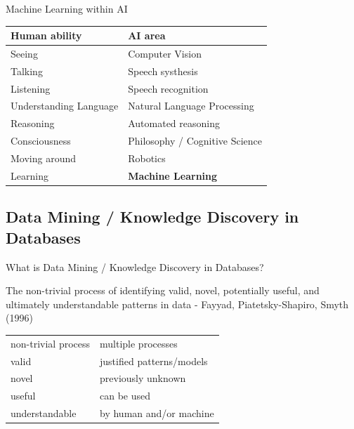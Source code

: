 \documentclass{beamer}
\begin{document}
\begin{frame}{Machine Learning within AI}

\begin{center}
\begin{tabular}{ll}
\hline
Human ability & AI area \\
\hline\hline
Seeing & Computer Vision \\
Talking & Speech systhesis \\
Listening & Speech recognition \\
Understanding Language &  Natural Language Processing \\
Reasoning & Automated reasoning \\
Consciousness & Philosophy / Cognitive Science \\
Moving around & Robotics \\
Learning & \textbf{Machine Learning}\\
\hline
\end{tabular}
\end{center}


\end{frame}


\subsection{Data Mining / Knowledge Discovery in Databases}

\begin{frame}{What is Data Mining / Knowledge Discovery in Databases?}


\begin{block}{}
The non-trivial process of identifying valid, novel, potentially useful, and ultimately understandable patterns in data - Fayyad, Piatetsky-Shapiro, Smyth (1996)
\end{block}

\begin{center}
\begin{tabular}{l|l}
non-trivial process &  multiple processes\\
valid & justified patterns/models\\
novel & previously unknown\\
useful &  can be used\\
understandable & by human and/or machine
\end{tabular}
\end{center}


\end{frame}
\end{document}

